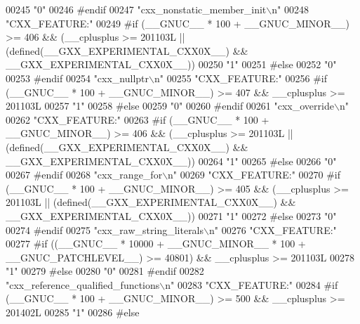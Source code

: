 \begin{DoxyCode}
00245 \textcolor{stringliteral}{"0"}
00246 \textcolor{preprocessor}{#endif}
00247 \textcolor{stringliteral}{"cxx\_nonstatic\_member\_init\(\backslash\)n"}
00248 \textcolor{stringliteral}{"CXX\_FEATURE:"}
00249 \textcolor{preprocessor}{#if (\_\_GNUC\_\_ * 100 + \_\_GNUC\_MINOR\_\_) >= 406 && (\_\_cplusplus >= 201103L ||
       (defined(\_\_GXX\_EXPERIMENTAL\_CXX0X\_\_) && \_\_GXX\_EXPERIMENTAL\_CXX0X\_\_))}
00250 \textcolor{stringliteral}{"1"}
00251 \textcolor{preprocessor}{#else}
00252 \textcolor{stringliteral}{"0"}
00253 \textcolor{preprocessor}{#endif}
00254 \textcolor{stringliteral}{"cxx\_nullptr\(\backslash\)n"}
00255 \textcolor{stringliteral}{"CXX\_FEATURE:"}
00256 \textcolor{preprocessor}{#if (\_\_GNUC\_\_ * 100 + \_\_GNUC\_MINOR\_\_) >= 407 && \_\_cplusplus >= 201103L}
00257 \textcolor{stringliteral}{"1"}
00258 \textcolor{preprocessor}{#else}
00259 \textcolor{stringliteral}{"0"}
00260 \textcolor{preprocessor}{#endif}
00261 \textcolor{stringliteral}{"cxx\_override\(\backslash\)n"}
00262 \textcolor{stringliteral}{"CXX\_FEATURE:"}
00263 \textcolor{preprocessor}{#if (\_\_GNUC\_\_ * 100 + \_\_GNUC\_MINOR\_\_) >= 406 && (\_\_cplusplus >= 201103L ||
       (defined(\_\_GXX\_EXPERIMENTAL\_CXX0X\_\_) && \_\_GXX\_EXPERIMENTAL\_CXX0X\_\_))}
00264 \textcolor{stringliteral}{"1"}
00265 \textcolor{preprocessor}{#else}
00266 \textcolor{stringliteral}{"0"}
00267 \textcolor{preprocessor}{#endif}
00268 \textcolor{stringliteral}{"cxx\_range\_for\(\backslash\)n"}
00269 \textcolor{stringliteral}{"CXX\_FEATURE:"}
00270 \textcolor{preprocessor}{#if (\_\_GNUC\_\_ * 100 + \_\_GNUC\_MINOR\_\_) >= 405 && (\_\_cplusplus >= 201103L ||
       (defined(\_\_GXX\_EXPERIMENTAL\_CXX0X\_\_) && \_\_GXX\_EXPERIMENTAL\_CXX0X\_\_))}
00271 \textcolor{stringliteral}{"1"}
00272 \textcolor{preprocessor}{#else}
00273 \textcolor{stringliteral}{"0"}
00274 \textcolor{preprocessor}{#endif}
00275 \textcolor{stringliteral}{"cxx\_raw\_string\_literals\(\backslash\)n"}
00276 \textcolor{stringliteral}{"CXX\_FEATURE:"}
00277 \textcolor{preprocessor}{#if ((\_\_GNUC\_\_ * 10000 + \_\_GNUC\_MINOR\_\_ * 100 + \_\_GNUC\_PATCHLEVEL\_\_) >= 40801) && \_\_cplusplus >= 201103L}
00278 \textcolor{stringliteral}{"1"}
00279 \textcolor{preprocessor}{#else}
00280 \textcolor{stringliteral}{"0"}
00281 \textcolor{preprocessor}{#endif}
00282 \textcolor{stringliteral}{"cxx\_reference\_qualified\_functions\(\backslash\)n"}
00283 \textcolor{stringliteral}{"CXX\_FEATURE:"}
00284 \textcolor{preprocessor}{#if (\_\_GNUC\_\_ * 100 + \_\_GNUC\_MINOR\_\_) >= 500 && \_\_cplusplus >= 201402L}
00285 \textcolor{stringliteral}{"1"}
00286 \textcolor{preprocessor}{#else}

\end{DoxyCode}
